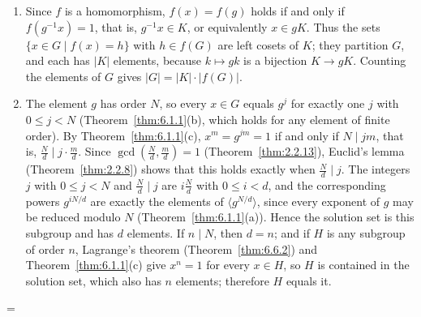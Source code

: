 \documentclass[11pt]{article}
\makeatletter
\theoremstyle{ntstyle}
\let\nt@closedisplay\]
\def\nt@guardedclose{\@ifnextchar\par{\nt@closeafterpar}{\@ifnextchar\end{\postdisplaypenalty\@M\nt@closedisplay}{\nt@closedisplay}}}
\def\nt@closeafterpar\par{\@ifnextchar\par{\nt@closeafterpar}{\@ifnextchar\end{\postdisplaypenalty\@M\nt@closedisplay\par}{\nt@closedisplay\par}}}
\renewenvironment{proof}[1][\proofname]{\par
  \pushQED{\qed}\normalfont\topsep\medskipamount\edef\nt@afterproof{\@endparpenalty=\the\@endparpenalty\relax}\@beginparpenalty\@M\@endparpenalty\@M\let\]\nt@guardedclose\trivlist\item[]\textit{#1\@addpunct{.}} \ignorespaces}{\ifvmode\addpenalty\@M\fi\popQED\nt@afterproof\endtrivlist\@endpefalse}
\makeatother
\begin{document}
\begin{proof}

	\begin{enumerate}[label={\alph*)}]
		\item Since $f$ is a homomorphism, $f(x)=f(g)$ holds if and only if
		      $f(g^{-1}x)=1$, that is, $g^{-1}x\in K$, or equivalently $x\in gK$.
		      Thus the sets $\{x\in G\mid f(x)=h\}$ with $h\in f(G)$ are left
		      cosets of $K$; they partition $G$, and each has $|K|$ elements,
		      because $k\mapsto gk$ is a bijection $K\to gK$. Counting the elements
		      of $G$ gives $|G|=|K|\cdot|f(G)|$.
		\item The element $g$ has order $N$, so every $x\in G$ equals $g^j$ for
		      exactly one $j$ with $0\le j<N$ (Theorem~\ref{thm:6.1.1}(b), which holds
		      for any element of finite order). By Theorem~\ref{thm:6.1.1}(c),
		      $x^m=g^{jm}=1$ if and only if $N\mid jm$, that is,
		      $\frac{N}{d}\mid j\cdot\frac{m}{d}$. Since $\gcd(\frac{N}{d},\frac{m}{d})=1$
		      (Theorem~\ref{thm:2.2.13}), Euclid's lemma (Theorem~\ref{thm:2.2.8})
		      shows that this holds exactly when $\frac{N}{d}\mid j$. The integers $j$
		      with $0\le j<N$ and $\frac{N}{d}\mid j$ are $i\frac{N}{d}$ with
		      $0\le i<d$, and the corresponding powers $g^{iN/d}$ are exactly the
		      elements of $\langle g^{N/d}\rangle$, since every exponent of $g$ may be
		      reduced modulo $N$ (Theorem~\ref{thm:6.1.1}(a)). Hence the solution set
		      is this subgroup and has $d$ elements. If $n\mid N$, then $d=n$; and if
		      $H$ is any subgroup of order $n$, Lagrange's theorem
		      (Theorem~\ref{thm:6.6.2}) and Theorem~\ref{thm:6.1.1}(c) give $x^n=1$ for
		      every $x\in H$, so $H$ is contained in the solution set, which also has
		      $n$ elements; therefore $H$ equals it.
	\end{enumerate}

\end{proof}
\end{document}
